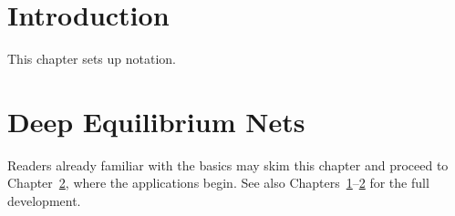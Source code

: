 \section{Introduction}
\label{ch:intro}

This chapter sets up notation.

\section{Deep Equilibrium Nets}
\label{ch:deqn}

Readers already familiar with the basics may skim this chapter and proceed
to Chapter~\ref{ch:deqn}, where the applications begin. See also
Chapters~\ref{ch:intro}--\ref{ch:deqn} for the full development.
